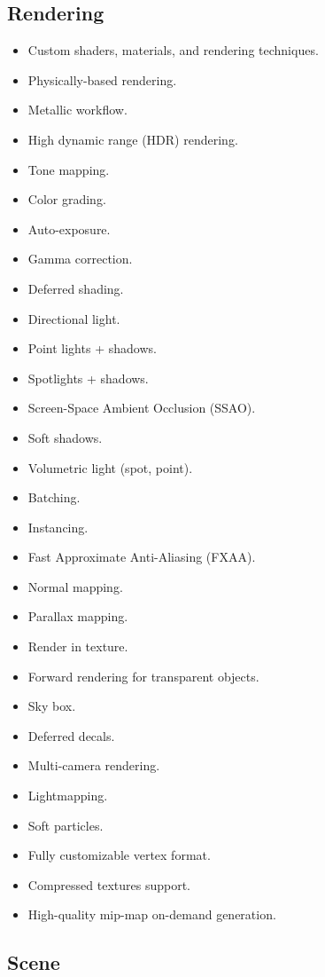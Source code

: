 \documentclass[
]{book}
\providecommand{\tightlist}{%
  \setlength{\itemsep}{0pt}\setlength{\parskip}{0pt}}
\theoremstyle{definition}
\theoremstyle{definition}
\theoremstyle{definition}
\theoremstyle{definition}
\theoremstyle{remark}
\begin{document}
\subsection{Rendering}\label{rendering}

\begin{itemize}
\tightlist
\item
  Custom shaders, materials, and rendering techniques.
\item
  Physically-based rendering.
\item
  Metallic workflow.
\item
  High dynamic range (HDR) rendering.
\item
  Tone mapping.
\item
  Color grading.
\item
  Auto-exposure.
\item
  Gamma correction.
\item
  Deferred shading.
\item
  Directional light.
\item
  Point lights + shadows.
\item
  Spotlights + shadows.
\item
  Screen-Space Ambient Occlusion (SSAO).
\item
  Soft shadows.
\item
  Volumetric light (spot, point).
\item
  Batching.
\item
  Instancing.
\item
  Fast Approximate Anti-Aliasing (FXAA).
\item
  Normal mapping.
\item
  Parallax mapping.
\item
  Render in texture.
\item
  Forward rendering for transparent objects.
\item
  Sky box.
\item
  Deferred decals.
\item
  Multi-camera rendering.
\item
  Lightmapping.
\item
  Soft particles.
\item
  Fully customizable vertex format.
\item
  Compressed textures support.
\item
  High-quality mip-map on-demand generation.
\end{itemize}

\subsection{Scene}\label{scene}
\end{document}
